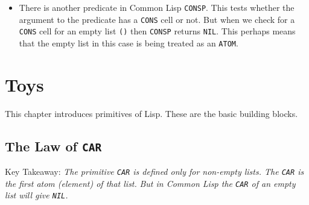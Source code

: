 \documentclass[11pt]{article}
\begin{document}
\begin{itemize}
\begin{verbatim}
(atom '())
» T
\end{verbatim}

We define our own predicate \texttt{ATOMP}

\begin{verbatim}
(defun atom? (x)
  (not (listp x)))
\end{verbatim}

So now \texttt{ATOMP} for our studies of this book will give \texttt{NIL} when tested for an empty list \texttt{'()}

\begin{verbatim}
(atom? '())
» NIL
\end{verbatim}

\item There is another predicate in Common Lisp \texttt{CONSP}. This tests whether the argument to the predicate has a \texttt{CONS}
cell or not. But when we check for a \texttt{CONS} cell for an empty list \texttt{()} then \texttt{CONSP} returns \texttt{NIL}. This perhaps
means that the empty list in this case is being treated as an \texttt{ATOM}.
\end{itemize}



\newpage
\section{Toys}
\label{sec:org91cdc1e}

This chapter introduces primitives of Lisp. These are the basic building blocks.

\subsection{The Law of \texttt{CAR}}
\label{sec:orgb4a418c}
Key Takeaway:
\emph{The primitive \texttt{CAR} is defined only for non-empty lists. The \texttt{CAR} is the first atom (element) of that list.}
\emph{But in Common Lisp the \texttt{CAR} of an empty list will give \texttt{NIL}.}

\vspace{1em}
\end{document}
